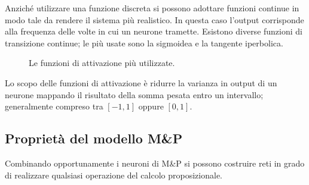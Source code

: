 Anziché utilizzare una funzione discreta si possono adottare funzioni continue in modo tale da rendere il sistema più realistico. In questa caso l'output corrisponde alla frequenza delle volte in cui un neurone tramette. Esistono diverse funzioni di transizione continue; le più usate sono la sigmoidea e la tangente iperbolica.\\

\begin{figure}[h!]
	\begin{center}
		\qquad
		\qquad
		\caption{Le funzioni di attivazione più utilizzate.}
	\end{center}
\end{figure}

Lo scopo delle funzioni di attivazione è ridurre la varianza in output di un neurone mappando il risultato della somma pesata entro un intervallo; generalmente compreso tra $[-1, 1]$ oppure $[0, 1]$.

\newpage

\subsection{Proprietà del modello M\&P} %
\label{sub:proprietà_del_modello}
Combinando opportunamente i neuroni di M\&P si possono costruire reti in grado di realizzare qualsiasi operazione del calcolo proposizionale.

